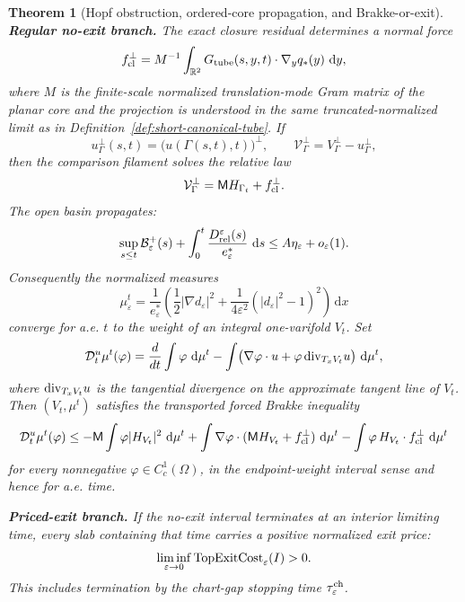 \documentclass[11pt]{article}
\newtheorem{theorem}{Theorem}[section]
\theoremstyle{definition}
\newcommand{\R}{\mathbb R}
\newcommand{\dd}{\,\mathrm d}
\newcommand{\eps}{\varepsilon}
\newcommand{\estar}{e_\varepsilon^\ast}
\newcommand{\Basin}{\mathcal B}
\newcommand{\Mmob}{\mathsf M}
\newcommand{\Vrel}{\mathcal V}
\begin{document}
\begin{theorem}[Hopf obstruction, ordered-core propagation, and Brakke-or-exit]
\smallskip
\noindent\textbf{Regular no-exit branch.}
The exact closure residual determines a normal force
\[
        f_{\rm cl}^\perp
        =
        M^{-1}
        \int_{\R^2}
        G_{\rm tube}(s,y,t)\cdot\nabla_y q_\ast(y)\,\dd y ,
\]
where \(M\) is the finite-scale normalized translation-mode Gram matrix of the
planar core and the projection is understood in the same truncated-normalized
limit as in Definition~\ref{def:short-canonical-tube}.  If
\[
        u_\Gamma^\perp(s,t)
        =
        \bigl(u(\Gamma(s,t),t)\bigr)^\perp,
        \qquad
        \Vrel_\Gamma^\perp
        =
        V_\Gamma^\perp-u_\Gamma^\perp ,
\]
then the comparison filament solves the relative law
\[
        \Vrel_\Gamma^\perp
        =
        \Mmob H_{\Gamma_t}+f_{\rm cl}^\perp .
\]
The open basin propagates:
\[
        \sup_{s\le t}\Basin_\eps^+(s)
        +
        \int_0^t
        \frac{D_{\rm rel}^\eps(s)}{\estar}\,\dd s
        \le
        A\eta_\eps+o_\eps(1).
\]
Consequently the normalized measures
\[
        \mu_\eps^t
        =
        \frac{1}{\estar}
        \left(
        \frac12|\nabla d_\eps|^2
        +
        \frac{1}{4\eps^2}(|d_\eps|^2-1)^2
        \right)\dd x
\]
converge for a.e. \(t\) to the weight of an integral one-varifold \(V_t\).  Set
\[
        \mathcal D_t^u\mu^t(\varphi)
        =
        \frac{d}{dt}\int \varphi\,\dd\mu^t
        -
        \int
        \bigl(\nabla\varphi\cdot u
        +\varphi\,{\rm div}_{T_xV_t}u\bigr)\,\dd\mu^t ,
\]
where \({\rm div}_{T_xV_t}u\) is the tangential divergence on the approximate
tangent line of \(V_t\).  Then \((V_t,\mu^t)\) satisfies the transported forced
Brakke inequality
\begin{equation}\label{eq:short-brakke}
\mathcal D_t^u\mu^t(\varphi)
\le
 -\Mmob\int\varphi |H_{V_t}|^2\,\dd\mu^t
 +\int\nabla\varphi\cdot(\Mmob H_{V_t}+f_{\rm cl}^\perp)\,\dd\mu^t
 -\int\varphi\,H_{V_t}\cdot f_{\rm cl}^\perp\,\dd\mu^t
\end{equation}
for every nonnegative \(\varphi\in C_c^1(\Omega)\), in the endpoint-weight
interval sense and hence for a.e. time.

\smallskip
\noindent\textbf{Priced-exit branch.}
If the no-exit interval terminates at an interior limiting time, every slab
containing that time carries a positive normalized exit price:
\[
        \liminf_{\eps\to0}
        {\rm TopExitCost}_\eps(I)>0 .
\]
This includes termination by the chart-gap stopping time
\(\tau_\eps^{\rm ch}\).


\end{theorem}
\end{document}
